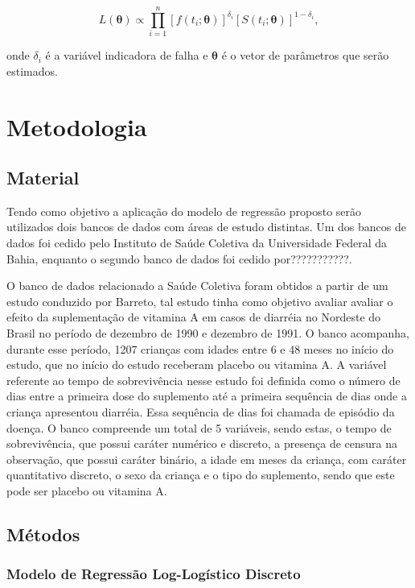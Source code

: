 \documentclass[
	article,
	12pt,				%
	openright,			%
	twoside,			%
	a4paper,			%
	english,			%
	french,				%
	spanish,			%
	brazil				%
	]{abntex2}
\begin{document}
\begin{equation} \label{eq:maxv1}
  L(\boldsymbol{\theta}) \propto \prod_{i=1}^n \left[f(t_i;\boldsymbol{\theta})\right]^{\delta_i} \left[S(t_i;\boldsymbol{\theta})\right]^{1-\delta_i}, 
\end{equation}

onde $\delta_i$ é a variável indicadora de falha e $\boldsymbol{\theta}$ é o vetor de parâmetros que serão estimados.

\section{Metodologia}
\subsection{Material}

Tendo como objetivo a aplicação do modelo de regressão proposto serão utilizados dois bancos de dados com áreas de estudo distintas. Um dos bancos de dados foi cedido pelo Instituto de Saúde Coletiva da Universidade Federal da Bahia, enquanto o segundo banco de dados foi cedido por???????????.

O banco de dados relacionado a Saúde Coletiva foram obtidos a partir de um estudo conduzido por Barreto\cite{Barreto;1994}, tal estudo tinha como objetivo avaliar avaliar o efeito da suplementação de vitamina A em casos de diarréia no Nordeste do Brasil no período de dezembro de 1990 e dezembro de 1991. O banco acompanha, durante esse período, 1207 crianças com idades entre 6 e 48 meses no início do estudo, que no início do estudo receberam placebo ou vitamina A. A variável referente ao tempo de sobrevivência nesse estudo foi definida como o número de dias entre a primeira dose do suplemento até a primeira sequência de dias onde a criança apresentou diarréia. Essa sequência de dias foi chamada de episódio da doença. O banco compreende um total de 5 variáveis, sendo estas, o tempo de sobrevivência, que possui caráter numérico e discreto, a presença de censura na observação, que possui caráter binário, a idade em meses da criança, com caráter quantitativo discreto, o sexo da criança e o tipo do suplemento, sendo que este pode ser placebo ou vitamina A.

\subsection{Métodos}

\subsubsection{Modelo de Regressão Log-Logístico Discreto}


\end{document}
